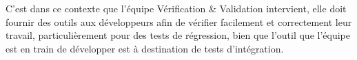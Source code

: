 		C'est dans ce contexte que l'équipe Vérification \& Validation intervient, elle doit fournir des outils aux développeurs afin de vérifier facilement et correctement leur travail, particulièrement pour des tests de régression, bien que l'outil que l'équipe est en train de développer est à destination de tests d'intégration.

